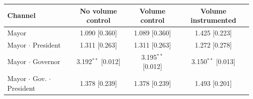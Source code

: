\begin{tabular}{@{}lccc@{}}
\toprule
Channel & No volume control & Volume control & Volume instrumented \\
\midrule
Mayor & 1.090 [0.360] & 1.089 [0.360] & 1.425 [0.223] \\
Mayor $\cdot$ President & 1.311 [0.263] & 1.311 [0.263] & 1.272 [0.278] \\
Mayor $\cdot$ Governor & 3.192$^{**}$ [0.012] & 3.195$^{**}$ [0.012] & 3.150$^{**}$ [0.013] \\
Mayor $\cdot$ Gov. $\cdot$ President & 1.378 [0.239] & 1.378 [0.239] & 1.493 [0.201] \\
\bottomrule
\end{tabular}
